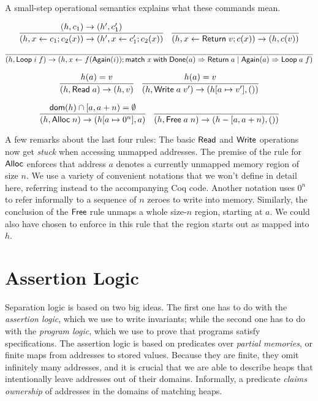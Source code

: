 \documentclass{amsbook}
\theoremstyle{definition}
\theoremstyle{remark}
\numberwithin{section}{chapter}
\numberwithin{equation}{chapter}
\begin{document}
A small-step operational semantics explains what these commands mean.

$$\infer{\smallstep{(h, x \leftarrow c_1; c_2(x))}{(h', x \leftarrow c'_1; c_2(x))}}{
  \smallstep{(h, c_1)}{(h', c'_1)}
}
\quad \infer{\smallstep{(h, x \leftarrow \mt{Return} \; v; c(x))}{(h, c(v))}}{}$$

$$\infer{\smallstep{(h, \mt{Loop} \; i \; f)}{(h, x \leftarrow f(\mt{Again}(i)); \mt{match} \; x \; \mt{with} \; \mt{Done}(a) \Rightarrow \mt{Return} \; a \mid \mt{Again}(a) \Rightarrow \mt{Loop} \; a \; f)}}{}$$

$$\infer{\smallstep{(h, \mt{Read} \; a)}{(h, v)}}{
  \msel{h}{a} = v
}
\quad \infer{\smallstep{(h, \mt{Write} \; a \; v')}{(\mupd{h}{a}{v'}, ())}}{
  \msel{h}{a} = v
}$$

$$\infer{\smallstep{(h, \mt{Alloc} \; n)}{(\mupd{h}{a}{0^n}, a)}}{
  \dom{h} \cap [a, a+n) = \emptyset
}
\quad \infer{\smallstep{(h, \mt{Free} \; a \; n)}{(h - [a, a+n), ())}}{
}$$

A few remarks about the last four rules:
The basic $\mathsf{Read}$ and $\mathsf{Write}$ operations now get \emph{stuck} when accessing unmapped addresses.
The premise of the rule for $\mathsf{Alloc}$ enforces that address $a$ denotes a currently unmapped memory region of size $n$.
We use a variety of convenient notations that we won't define in detail here, referring instead to the accompanying Coq code.
Another notation uses $0^n$ to refer informally to a sequence of $n$ zeroes to write into memory.
Similarly, the conclusion of the $\mathsf{Free}$ rule unmaps a whole size-$n$ region, starting at $a$.
We could also have chosen to enforce in this rule that the region starts out as mapped into $h$.

\section{Assertion Logic}

Separation logic is based on two big ideas.
The first one has to do with the \emph{assertion logic}, which we use to write invariants; while the second one has to do with the \emph{program logic}, which we use to prove that programs satisfy specifications.
The assertion logic is based on predicates over \emph{partial memories}, or finite maps from addresses to stored values.
Because they are finite, they omit infinitely many addresses, and it is crucial that we are able to describe heaps that intentionally leave addresses out of their domains.
Informally, a predicate \emph{claims ownership} of addresses in the domains of matching heaps.
\end{document}
